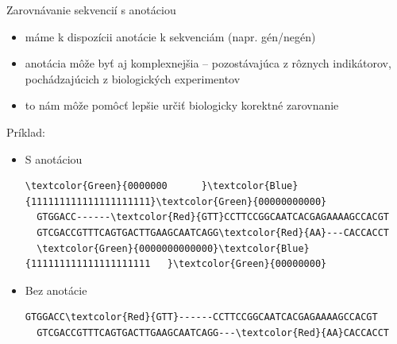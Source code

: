 \documentclass[xcolor=dvipsnames, compress, 12pt]{beamer}
\theoremstyle{definition}
\begin{document}
\begin{frame}[fragile]{Zarovnávanie sekvencií s anotáciou}
\begin{itemize}
  \item máme k dispozícii anotácie k sekvenciám (napr. gén/negén)
  \item anotácia môže byť aj komplexnejšia -- pozostávajúca z rôznych indikátorov, pochádzajúcich z biologických experimentov
  \item to nám môže pomôcť lepšie určiť biologicky korektné zarovnanie
  \end{itemize}
  \pause
  Príklad:
  \begin{itemize}
  \item S anotáciou
 \begin{Verbatim}[commandchars=\\\{\}]
  \textcolor{Green}{0000000      }\textcolor{Blue}{111111111111111111111}\textcolor{Green}{00000000000}
  GTGGACC------\textcolor{Red}{GTT}CCTTCCGGCAATCACGAGAAAAGCCACGT
  GTCGACCGTTTCAGTGACTTGAAGCAATCAGG\textcolor{Red}{AA}---CACCACCT
  \textcolor{Green}{0000000000000}\textcolor{Blue}{111111111111111111111   }\textcolor{Green}{00000000}
  \end{Verbatim}
  \item Bez anotácie
  \begin{Verbatim}[commandchars=\\\{\}]
  GTGGACC\textcolor{Red}{GTT}------CCTTCCGGCAATCACGAGAAAAGCCACGT
  GTCGACCGTTTCAGTGACTTGAAGCAATCAGG---\textcolor{Red}{AA}CACCACCT
  \end{Verbatim}
\end{itemize}
\end{frame}

\end{document}
